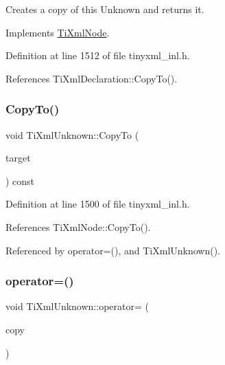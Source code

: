 Creates a copy of this Unknown and returns it. 



Implements \hyperlink{class_ti_xml_node_a4508cc3a2d7a98e96a54cc09c37a78a4}{Ti\+Xml\+Node}.



Definition at line 1512 of file tinyxml\+\_\+inl.\+h.



References Ti\+Xml\+Declaration\+::\+Copy\+To().

\hypertarget{class_ti_xml_unknown_afeb334446bcbe13ce15131e1629712be}{}\label{class_ti_xml_unknown_afeb334446bcbe13ce15131e1629712be} 
\subsubsection{\texorpdfstring{Copy\+To()}{CopyTo()}}
{\footnotesize\ttfamily void Ti\+Xml\+Unknown\+::\+Copy\+To (\begin{DoxyParamCaption}\item[{\hyperlink{class_ti_xml_unknown}{Ti\+Xml\+Unknown} $\ast$}]{target }\end{DoxyParamCaption}) const\hspace{0.3cm}{\ttfamily [protected]}}



Definition at line 1500 of file tinyxml\+\_\+inl.\+h.



References Ti\+Xml\+Node\+::\+Copy\+To().



Referenced by operator=(), and Ti\+Xml\+Unknown().

\hypertarget{class_ti_xml_unknown_a5097fe228cd5ad4edcdddf02c334fd83}{}\label{class_ti_xml_unknown_a5097fe228cd5ad4edcdddf02c334fd83} 
\subsubsection{\texorpdfstring{operator=()}{operator=()}}
{\footnotesize\ttfamily void Ti\+Xml\+Unknown\+::operator= (\begin{DoxyParamCaption}\item[{const \hyperlink{class_ti_xml_unknown}{Ti\+Xml\+Unknown} \&}]{copy }\end{DoxyParamCaption})\hspace{0.3cm}{\ttfamily [inline]}}



